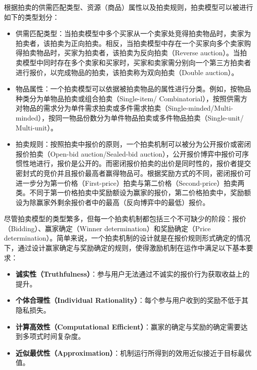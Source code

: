 

根据拍卖的供需匹配类型、资源（商品）属性以及拍卖规则，拍卖模型可以被进行如下的类型划分：
\begin{itemize}
\item 供需匹配类型：当拍卖模型中多个买家从一个卖家处竞得拍卖物品时，卖家为拍卖者，该拍卖为正向拍卖。相反，当拍卖模型中存在一个买家向多个卖家购得拍卖物品时，买家为拍卖者，该拍卖为反向拍卖（Reverse auction）。当拍卖模型中同时存在多个卖家和买家时，买家和卖家需分别向一个第三方拍卖者进行报价，以完成物品的拍卖，该拍卖称为双向拍卖（Double auction）。
\item 物品属性：一个拍卖模型可以依据被拍卖物品的属性进行分类。例如，按物品种类分为单物品拍卖或组合拍卖（Single-item/ Combinatorial），按照供需方对物品的需求分为单件需求拍卖或多件需求拍卖（Single-minded/Multi-minded），按同一物品份数分为单件物品拍卖或多件物品拍卖（Single-unit/ Multi-unit）。
\item 拍卖规则：按照拍卖中报价的原则，一个拍卖机制可以被分为公开报价或密闭报价拍卖（Open-bid auction/Sealed-bid auction），公开报价博弈中报价可序惯性地进行，报价是公开的。而密闭报价拍卖的出价是同时性的，报价者提交密封式的竞价并且报价最高者赢得物品可。根据奖励方式的不同，密闭报价可进一步分为第一价格（First-price）拍卖与第二价格（Second-price）拍卖两类。不同于第一价格拍卖中奖励额设为赢家的报价，第二价格拍卖中，奖励额设为除赢家外剩余报价者中的最高（反向博弈中的最低）报价。
\end{itemize}
尽管拍卖模型的类型繁多，但每一个拍卖机制都包括三个不可缺少的阶段：报价（Bidding）、赢家确定（Winner determination）和奖励确定（Price determination）。简单来说，一个拍卖机制的设计就是在报价规则形式确定的情况下，通过设计赢家确定与奖励确定的规则，使得激励机制在运作中满足以下基本要求：
\begin{itemize}
\item \textbf{诚实性（Truthfulness）}：参与用户无法通过不诚实的报价行为获取收益上的提升。
\item \textbf{个体合理性（Individual Rationality）}：每个参与用户收到的奖励不低于其隐私损失。
\item \textbf{计算高效性（Computational Efficient）}：赢家的确定与奖励的确定需要达到多项式时间复杂度。
\item \textbf{近似最优性（Approximation）}：机制运行所得到的效用近似接近于目标最优值。
\end{itemize}
